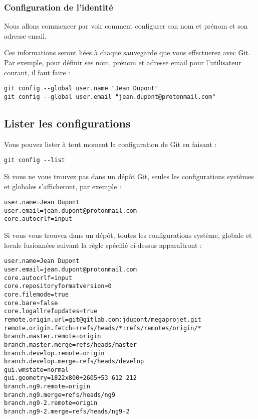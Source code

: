 \documentclass{article}
\begin{document}
\subsubsection*{Configuration de l'identité}
Nous allons commencer par voir comment configurer son nom et prénom et son adresse email.

Ces informations seront liées à chaque sauvegarde que vous effectuerez avec {\color{blue}Git}. Par exemple, pour définir ses nom, prénom et adresse email pour l'utilisateur courant, il faut faire :

\begin{verbatim}
git config --global user.name "Jean Dupont"
git config --global user.email "jean.dupont@protonmail.com"
\end{verbatim}

\subsection{Lister les configurations}
Vous pouvez lister à tout moment la configuration de {\color{blue}Git} en faisant :

\begin{verbatim}
git config --list
\end{verbatim}

Si vous ne vous trouvez pas dans un dépôt {\color{blue}Git}, seules les configurations systèmes et globales s'afficheront, par exemple :

\begin{verbatim}
user.name=Jean Dupont
user.email=jean.dupont@protonmail.com
core.autocrlf=input
\end{verbatim}

Si vous vous trouvez dans un dépôt, toutes les configurations système, globale et locale fusionnées suivant la règle spécifié ci-dessus apparaîtront :

\begin{verbatim}
user.name=Jean Dupont
user.email=jean.dupont@protonmail.com
core.autocrlf=input
core.repositoryformatversion=0
core.filemode=true
core.bare=false
core.logallrefupdates=true
remote.origin.url=git@gitlab.com:jdupont/megaprojet.git
remote.origin.fetch=+refs/heads/*:refs/remotes/origin/*
branch.master.remote=origin
branch.master.merge=refs/heads/master
branch.develop.remote=origin
branch.develop.merge=refs/heads/develop
gui.wmstate=normal
gui.geometry=1822x800+2605+53 612 212
branch.ng9.remote=origin
branch.ng9.merge=refs/heads/ng9
branch.ng9-2.remote=origin
branch.ng9-2.merge=refs/heads/ng9-2
\end{verbatim}
\end{document}
